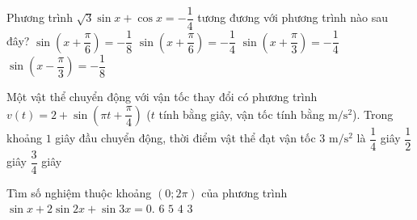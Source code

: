 	\begin{ex}%
		Phương trình $\sqrt{3}\sin x+\cos x=-\dfrac{1}{4}$ tương đương với phương trình nào sau đây?
		\choice
		{\True $\sin \left(x+\dfrac{\pi }{6}\right)=-\dfrac{1}{8}$}
		{$\sin \left(x+\dfrac{\pi }{6}\right)=-\dfrac{1}{4}$}
		{$\sin \left(x+\dfrac{\pi }{3}\right)=-\dfrac{1}{4}$}
		{$\sin \left(x-\dfrac{\pi }{3}\right)=-\dfrac{1}{8}$}
	\end{ex}
\begin{ex}%
	Một vật thể chuyển động với vận tốc thay đổi có phương trình  $v(t) = 2+\sin\left(\pi t +\dfrac{\pi}{4}\right)$  ($t$ tính bằng giây, vận tốc tính bằng $\mathrm{m/s^2}$).
	Trong khoảng $1$ giây đầu chuyển động, thời  điểm vật thể đạt vận tốc $3$ $\mathrm{m/s^2}$ là 
	{\True $\dfrac{1}{4}$ giây}
	{$\dfrac{1}{2}$ giây}
	{$\dfrac{3}{4}$ giây}
\end{ex}
\begin{ex}%
	Tìm số nghiệm thuộc khoảng $(0;2\pi)$ của phương trình $\sin x + 2\sin2x + \sin3x=0.$
	\choice
	{$6$}
	{$5$}
	{$4$}
	{\True $3$}
\end{ex}
